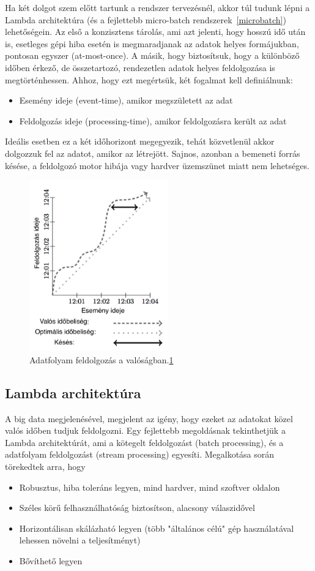 \documentclass[a4paper,12pt]{article}
\begin{document}
Ha két dolgot szem előtt tartunk a rendszer tervezésnél, akkor túl tudunk lépni a Lambda architektúra (és a fejlettebb micro-batch rendszerek~\ref{microbatch}) lehetőségein. Az első a konzisztens tárolás, ami azt jelenti, hogy hosszú idő után is, esetleges gépi hiba esetén is megmaradjanak az adatok helyes formájukban, pontosan egyszer (at-most-once). A másik, hogy biztosítsuk, hogy a különböző időben érkező, de összetartozó, rendezetlen adatok helyes feldolgozása is megtörténhessen. Ahhoz, hogy ezt megértsük, két fogalmat kell definiálnunk:
\begin{itemize}
\item Esemény ideje (event-time), amikor megszületett az adat
\item Feldolgozás ideje (processing-time), amikor feldolgozásra került az adat
\end{itemize}
Ideális esetben ez a két időhorizont megegyezik, tehát közvetlenül akkor dolgozzuk fel az adatot, amikor az létrejött. Sajnos, azonban a bemeneti forrás késése, a feldolgozó motor hibája vagy hardver üzemszünet miatt nem lehetséges. 
 
\begin{figure}[ht!]
\centering
\includegraphics[width=60mm]{img/skew.png}
\caption{Adatfolyam feldolgozás a valóságban.\ref{skew} \label{skew}} 
\end{figure}

\subsection{Lambda architektúra}
A big data megjelenésével, megjelent az igény, hogy ezeket az adatokat közel valós időben tudjuk feldolgozni. Egy fejlettebb megoldásnak tekinthetjük a Lambda architektúrát, ami a kötegelt feldolgozást (batch processing), és a adatfolyam feldolgozást (stream processing) egyesíti. Megalkotása során törekedtek arra, hogy 
\begin{itemize}
\item Robusztus, hiba toleráns legyen, mind hardver, mind szoftver oldalon
\item Széles körű felhasználhatóság biztosítson, alacsony válaszidővel
\item Horizontálisan skálázható legyen (több "általános célú" gép használatával lehessen növelni a teljesítményt)
\item Bővíthető legyen
\end{itemize}
\end{document}

